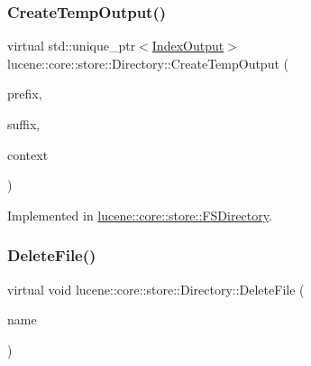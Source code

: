 \subsubsection{\texorpdfstring{Create\+Temp\+Output()}{CreateTempOutput()}}
{\footnotesize\ttfamily virtual std\+::unique\+\_\+ptr$<$\mbox{\hyperlink{classlucene_1_1core_1_1store_1_1IndexOutput}{Index\+Output}}$>$ lucene\+::core\+::store\+::\+Directory\+::\+Create\+Temp\+Output (\begin{DoxyParamCaption}\item[{\mbox{\hyperlink{ZlibCrc32_8h_a2c212835823e3c54a8ab6d95c652660e}{const}} std\+::string \&}]{prefix,  }\item[{\mbox{\hyperlink{ZlibCrc32_8h_a2c212835823e3c54a8ab6d95c652660e}{const}} std\+::string \&}]{suffix,  }\item[{\mbox{\hyperlink{ZlibCrc32_8h_a2c212835823e3c54a8ab6d95c652660e}{const}} \mbox{\hyperlink{classlucene_1_1core_1_1store_1_1IOContext}{I\+O\+Context}} \&}]{context }\end{DoxyParamCaption})\hspace{0.3cm}{\ttfamily [pure virtual]}}



Implemented in \mbox{\hyperlink{classlucene_1_1core_1_1store_1_1FSDirectory_a488eb837cbe2d5a46363e57c314def3a}{lucene\+::core\+::store\+::\+F\+S\+Directory}}.

\mbox{\label{classlucene_1_1core_1_1store_1_1Directory_ae7e4ec460d8646abb925fa9d31a6f354}} 
\subsubsection{\texorpdfstring{Delete\+File()}{DeleteFile()}}
{\footnotesize\ttfamily virtual void lucene\+::core\+::store\+::\+Directory\+::\+Delete\+File (\begin{DoxyParamCaption}\item[{\mbox{\hyperlink{ZlibCrc32_8h_a2c212835823e3c54a8ab6d95c652660e}{const}} std\+::string \&}]{name }\end{DoxyParamCaption})\hspace{0.3cm}{\ttfamily [pure virtual]}}



